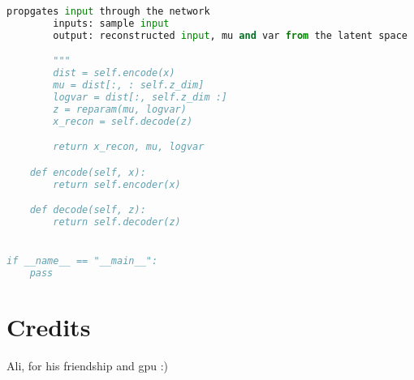 \documentclass[justified,nobib]{tufte-handout}
\begin{document}
\begin{fullwidth}
\begin{lstlisting}[language=Python]
        propgates input through the network
        inputs: sample input
        output: reconstructed input, mu and var from the latent space

        """
        dist = self.encode(x)
        mu = dist[:, : self.z_dim]
        logvar = dist[:, self.z_dim :]
        z = reparam(mu, logvar)
        x_recon = self.decode(z)

        return x_recon, mu, logvar

    def encode(self, x):
        return self.encoder(x)

    def decode(self, z):
        return self.decoder(z)


if __name__ == "__main__":
    pass


\end{lstlisting}
\clearpage
{}

\section{Credits}
Ali, for his friendship and gpu :)
\clearpage
\end{fullwidth}
\end{document}
